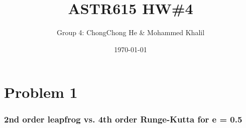 



\title{ASTR615 HW\#4}
\author{Group 4: ChongChong He \& Mohammed Khalil\\}
\date{\today}
\maketitle


\section{Problem 1}

\subsubsection*{2nd order leapfrog vs. 4th order Runge-Kutta for e = 0.5}

